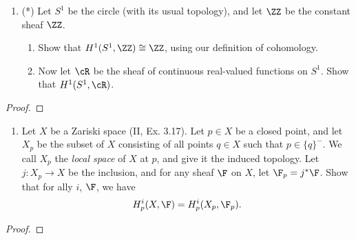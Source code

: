 \documentclass[12pt]{amsart}
\begin{document}
\begin{enumerate}
  \item[2.7.] {
      (*) Let $S^1$ be the circle (with its usual topology), and let $\ZZ$ be the constant sheaf $\ZZ$.
      \begin{enumerate}
        \item Show that $H^1(S^1,\ZZ)\cong \ZZ$, using our definition of cohomology.
        \item Now let $\cR$ be the sheaf of continuous real-valued functions on $S^1$.
          Show that $H^1(S^1,\cR)$.
      \end{enumerate}
    }
\end{enumerate}

\begin{proof}
\end{proof}


\begin{enumerate}
  \item[2.5.] {
      Let $X$ be a Zariski space (II, Ex. 3.17).
      Let $p\in X$ be a closed point, and let $X_p$ be the subset of $X$ consisting of all points $q\in X$ such that $p\in \{q\}^-$.
      We call $X_p$ the \emph{local space} of $X$ at $p$, and give it the induced topology.
      Let $j:X_p\to X$ be the inclusion, and for any sheaf $\F$ on $X$, let $\F_p=j^*\F$.
      Show that for ally $i$, $\F$, we have
      \[
        H^i_p(X,\F) = H_p^i(X_p,\F_p).
      \] 
    }
\end{enumerate}

\begin{proof}
\end{proof}
\end{document}
